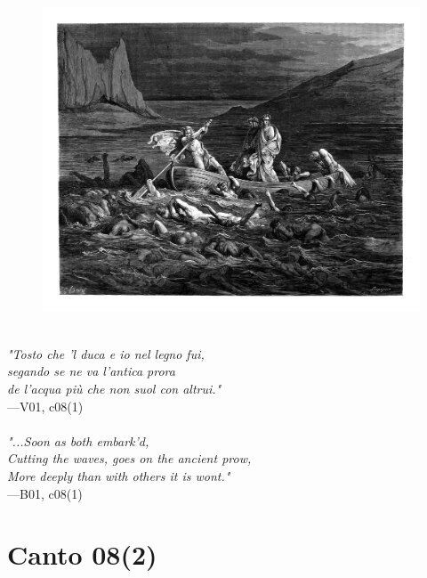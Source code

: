 \documentclass[../Dore_vision.tex]{subfiles}
\begin{document}
\begin{figure}[ht]
\centering
\includegraphics[height=\figsize]{illustrations/book_1/V01, c08(1).jpg}
\end{figure}

\begin{center}
\begin{minipage}{0.8\linewidth}
\textit{\\
"Tosto che ’l duca e io nel legno fui,\\segando se ne va l’antica prora\\de l’acqua più che non suol con altrui."} \\
—V01, c08(1) \\~\\
\textit{"...Soon as both embark'd,\\Cutting the waves, goes on the ancient prow,\\More deeply than with others it is wont."} \\
—B01, c08(1)
\end{minipage}
\end{center}

\newpage

\section{Canto 08(2)}
\end{document}

